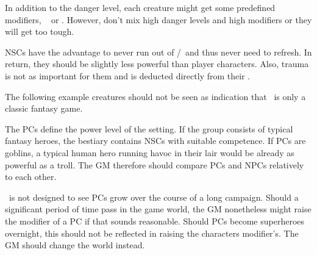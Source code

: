 {		\nipajinTableNSC

		\noindent
		In addition to the danger level, each creature might get some predefined modifiers, \eg\  or . However, don't mix high danger levels and high modifiers or they will get too tough.

		NSCs have the advantage to never run out of \AD/\RD\ and thus never need to refresh. In return, they should be slightly less powerful than player characters. Also, trauma is not as important for them and is deducted directly from their \HD.


		\noindent
		The following example creatures should not be seen as indication that \nipajin\ is only a classic fantasy game.

		\nipajinTableBestiary


		\noindent
		The PCs define the power level of the setting. If the group consists of typical fantasy heroes, the bestiary contains NSCs with suitable competence. If PCs are goblins, a typical human hero running havoc in their lair would be already as powerful as a troll. The GM therefore should compare PCs and NPCs relatively to each other.

		\nipajin\ is not designed to see PCs grow over the course of a long campaign. Should a significant period of time pass in the game world, the GM nonetheless might raise the modifier of a PC if that sounds reasonable. Should PCs become superheroes overnight, this should not be reflected in raising the characters modifier's. The GM should change the world instead.

}

